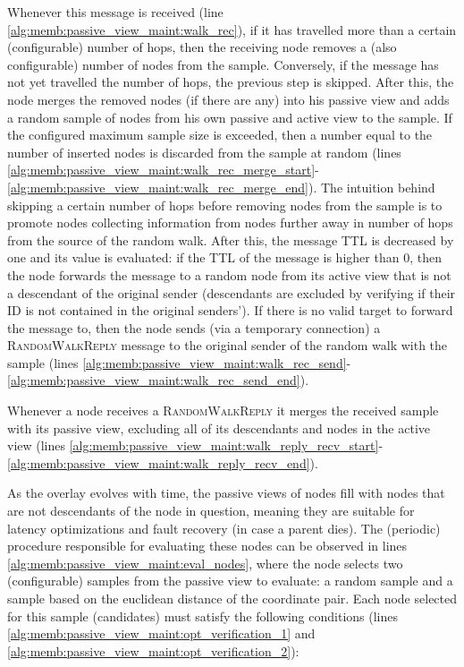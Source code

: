 

Whenever this message is received (line \ref{alg:memb:passive_view_maint:walk_rec}), if it has travelled more than a certain (configurable) number of hops, then the receiving node removes a (also configurable) number of nodes from the sample. Conversely, if the message has not yet travelled the number of hops, the previous step is skipped. After this, the node merges the removed nodes (if there are any) into his passive view and adds a random sample of nodes from his own passive and active view to the sample. If the configured maximum sample size is exceeded, then a number equal to the number of inserted nodes is discarded from the sample at random (lines \ref{alg:memb:passive_view_maint:walk_rec_merge_start}-\ref{alg:memb:passive_view_maint:walk_rec_merge_end}). The intuition behind skipping a certain number of hops before removing nodes from the sample is to promote nodes collecting information from nodes further away in number of hops from the source of the random walk. After this, the message TTL is decreased by one and its value is evaluated: if the TTL of the message is higher than 0, then the node forwards the message to a random node from its active view that is not a descendant of the original sender (descendants are excluded by verifying if their ID is not contained in the original senders'). If there is no valid target to forward the message to, then the node sends (via a temporary connection) a \textsc{RandomWalkReply} message to the original sender of the random walk with the sample (lines \ref{alg:memb:passive_view_maint:walk_rec_send}-\ref{alg:memb:passive_view_maint:walk_rec_send_end}). 

Whenever a node receives a \textsc{RandomWalkReply} it merges the received sample with its passive view, excluding all of its descendants and nodes in the active view (lines \ref{alg:memb:passive_view_maint:walk_reply_recv_start}-\ref{alg:memb:passive_view_maint:walk_reply_recv_end}).

As the overlay evolves with time, the passive views of nodes fill with nodes that are not descendants of the node in question, meaning they are suitable for latency optimizations and fault recovery (in case a parent dies). The (periodic) procedure responsible for evaluating these nodes can be observed in lines \ref{alg:memb:passive_view_maint:eval_nodes}, where the node selects two (configurable) samples from the passive view to evaluate: a random sample and a sample based on the euclidean distance of the coordinate pair. Each node selected for this sample (candidates) must satisfy the following conditions (lines \ref{alg:memb:passive_view_maint:opt_verification_1} and \ref{alg:memb:passive_view_maint:opt_verification_2}): 

